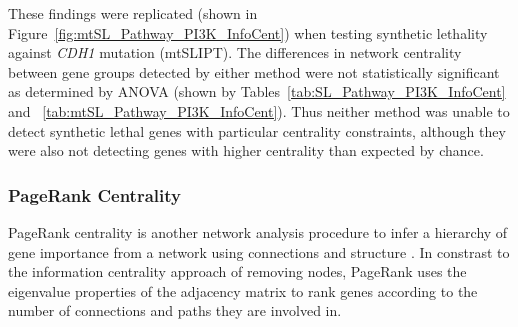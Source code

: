 \FloatBarrier

\begin{table*}[!htb]
\caption{ANOVA for Synthetic Lethality and Information Centrality}
\label{tab:SL_Pathway_PI3K_InfoCent}
\noindent{}
\end{table*}

These findings were replicated (shown in Figure~\ref{fig:mtSL_Pathway_PI3K_InfoCent}) when testing synthetic lethality against \textit{CDH1} mutation (mtSLIPT). The differences in network centrality between gene groups detected by either method were not statistically significant as determined by \gls{ANOVA} (shown by Tables~\ref{tab:SL_Pathway_PI3K_InfoCent} and ~\ref{tab:mtSL_Pathway_PI3K_InfoCent}). Thus neither method was unable to detect synthetic lethal genes with particular centrality constraints, although they were also not detecting genes with higher centrality than expected by chance.



\FloatBarrier

\subsubsection{PageRank Centrality}  \label{chapt4:Network_PageRank}

\FloatBarrier

PageRank centrality is another network analysis procedure to infer a hierarchy of gene importance from a network using connections and structure \citep{Brin1998}. In constrast to the information centrality approach of removing nodes, PageRank uses the eigenvalue properties of the adjacency matrix to rank genes according to the number of connections and paths they are involved in. 

